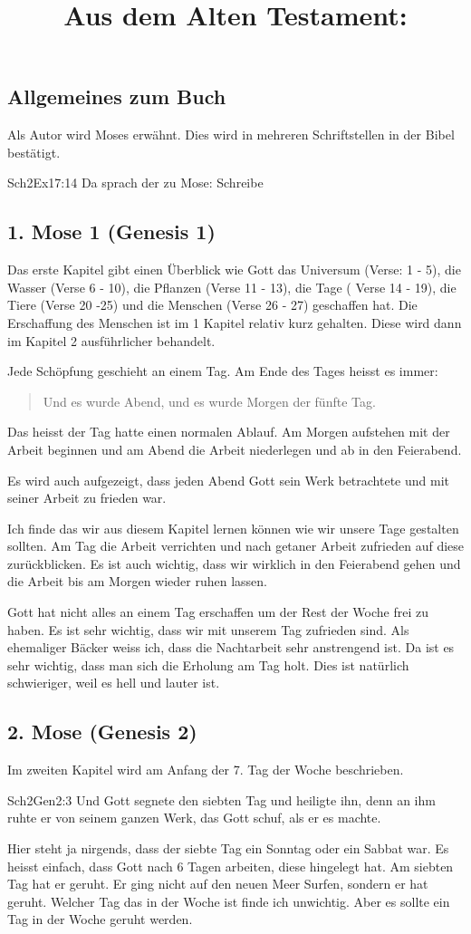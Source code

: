 \subsection{Allgemeines zum Buch}
Als Autor wird Moses erwähnt. Dies wird in mehreren Schriftstellen in der Bibel bestätigt.

\title{Aus dem Alten Testament: }
\begin{bibeltext}{Sch2}{Ex}{17:14}
	Da sprach der \herr{} zu Mose: \flqq Schreibe\frqq{}
\end{bibeltext}
\subsection{1. Mose 1 (Genesis 1)}
Das erste Kapitel gibt einen Überblick wie Gott das Universum (Verse: 1 - 5), die Wasser (Verse 6 - 10), die Pflanzen (Verse 11 - 13), die Tage ( Verse 14 - 19), die Tiere (Verse 20 -25) und die Menschen (Verse 26 - 27) geschaffen hat. Die Erschaffung des Menschen ist im 1 Kapitel relativ kurz gehalten. Diese wird dann im Kapitel 2 ausführlicher behandelt.

Jede Schöpfung geschieht an einem Tag. Am Ende des Tages heisst es immer: \begin{quote}
    Und es wurde Abend, und es wurde Morgen der fünfte Tag.
\end{quote} Das heisst der Tag hatte einen normalen Ablauf. Am Morgen aufstehen mit der Arbeit beginnen und am Abend die Arbeit niederlegen und ab in den Feierabend.

Es wird auch aufgezeigt, dass jeden Abend Gott sein Werk betrachtete und mit seiner Arbeit zu frieden war.

Ich finde das wir aus diesem Kapitel lernen können wie wir unsere Tage gestalten sollten. Am Tag die Arbeit verrichten und nach getaner Arbeit zufrieden auf diese zurückblicken. Es ist auch wichtig, dass wir wirklich in den Feierabend gehen und die Arbeit bis am Morgen wieder ruhen lassen.

Gott hat nicht alles an einem Tag erschaffen um der Rest der Woche frei zu haben. Es ist sehr wichtig, dass wir mit unserem Tag zufrieden sind. Als ehemaliger Bäcker weiss ich, dass die Nachtarbeit sehr anstrengend ist. Da ist es sehr wichtig, dass man sich die Erholung am Tag holt. Dies ist natürlich schwieriger, weil es hell und lauter ist.
\subsection{2. Mose (Genesis 2)}
Im zweiten Kapitel wird am Anfang der 7. Tag der Woche beschrieben. 
\begin{bibeltext}{Sch2}{Gen}{2:3}
    Und Gott segnete den siebten Tag und heiligte ihn, denn an ihm ruhte er von seinem ganzen Werk, das Gott schuf, als er es machte.
\end{bibeltext}
Hier steht ja nirgends, dass der siebte Tag ein Sonntag oder ein Sabbat war. Es heisst einfach, dass Gott nach 6 Tagen arbeiten, diese hingelegt hat. Am siebten Tag hat er geruht. Er ging nicht auf den neuen Meer Surfen, sondern er hat geruht. Welcher Tag das in der Woche ist finde ich unwichtig. Aber es sollte ein Tag in der Woche geruht werden.

